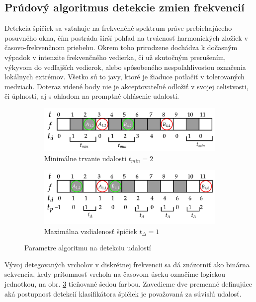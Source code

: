 \subsection{Prúdový algoritmus detekcie zmien frekvencií}
Detekcia špičiek sa vzťahuje na frekvenčné spektrum práve prebiehajúceho posuvného okna, čím postráda širší pohľad na trvácnosť
harmonických zložiek v časovo-frekvenčnom priebehu. Okrem toho prirodzene dochádza k dočasným výpadok v intenzite frekvenčného
vedierka, či už skutočným prerušením, výkyvom do vedľajších vedierok, alebo spôsobeného nespoľahlivosťou označenia lokálnych extrémov.
Všetko sú to javy, ktoré je žiaduce potlačiť v tolerovaných medziach. Doteraz videné body nie je akceptovateľné odložiť v svojej
celistvosti, či úplnosti, aj s ohľadom na promptné ohlásenie udalostí.
\begin{figure}[h!]
\centering
\begin{subfigure}[b]{0.8\textwidth}
    \centering
    \includegraphics[width=\textwidth]{figures/design/event-detection-min-duration.png}
    \caption{Minimálne trvanie udalosti $t_{min} = 2$}
    \label{event-detector:tmin}
\end{subfigure}
\begin{subfigure}[b]{0.8\textwidth}
    \centering
    \includegraphics[width=\textwidth]{figures/design/event-detection-time-proximity.png}
    \caption{Maximálna vzdialenosť špičiek $t_{\Delta} = 1$}
     \label{event-detector:tdelta}
\end{subfigure}
\caption{Parametre algoritmu na detekciu udalostí}
\label{event-detector}
\end{figure}

Vývoj detegovaných vrcholov v diskrétnej frekvencii sa dá znázorniť ako binárna sekvencia, kedy prítomnosť vrchola na časovom úseku
označíme logickou jednotkou, na obr. \ref{event-detector} tieňované šedou farbou. Zavedieme dve premenné definujúce aká postupnosť
detekcií klasifikátora špičiek je považovaná za súvislú udalosť.

